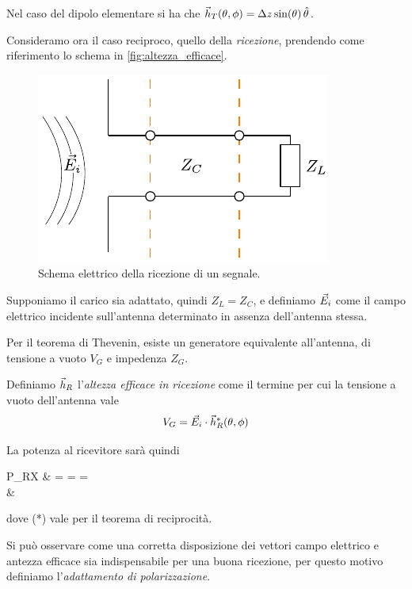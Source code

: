 Nel caso del dipolo elementare si ha che $\vec{h}_T(\theta,\phi) = \Delta z \sin(\theta) \,\hat{\theta}$.

\bigbreak
Consideramo ora il caso reciproco, quello della \emph{ricezione}, prendendo come riferimento lo schema in \autoref{fig:altezza_efficace}.

\begin{figure}[htp]
	\centering
	\includegraphics[]{img/altezza_efficace.pdf}
	\caption{Schema elettrico della ricezione di un segnale.}
	\label{fig:altezza_efficace}
\end{figure}

Supponiamo il carico sia adattato, quindi  $Z_L=Z_C$, e definiamo $\vec{E}_i$ come il campo elettrico incidente sull'antenna determinato in assenza dell'antenna stessa.

Per il teorema di Thevenin, esiste un generatore equivalente all'antenna, di tensione a vuoto $V_G$ e impedenza $Z_G$.

Definiamo $\vec{h}_R$ l'\emph{altezza efficace in ricezione} come il termine per cui la tensione a vuoto dell'antenna vale
\begin{equation}
	V_G=\vec{E}_i \cdot \vec{h}_R^*(\theta,\phi)
\end{equation}

La potenza al ricevitore sarà quindi
\begin{esp*}
	P_{RX}
	& = \Re{}
	=  
	=  \\
	& \stackrel{(*)}{=} 
\end{esp*}
dove (*) vale per il teorema di reciprocità.

Si può osservare come una corretta disposizione dei vettori campo elettrico e antezza efficace sia indispensabile per una buona ricezione, per questo motivo definiamo l'\emph{adattamento di polarizzazione}.

